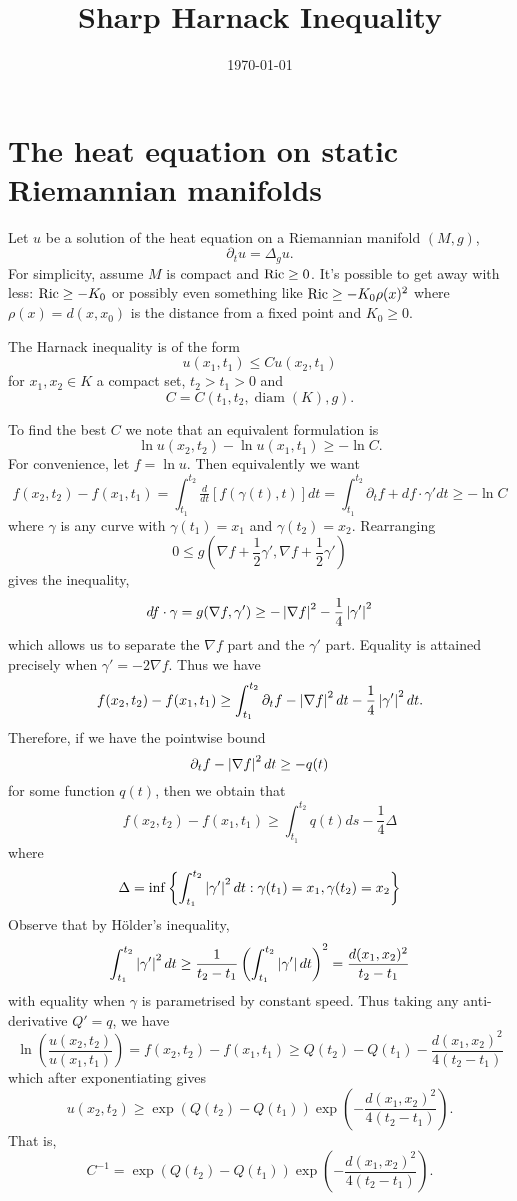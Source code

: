 \documentclass{amsart}
\begin{document}
\title{Sharp Harnack Inequality}

\curraddr{}
\email{}
\date{\today}

\dedicatory{}
\subjclass[2010]{}
\keywords{}

\maketitle

\section{The heat equation on static Riemannian manifolds}

Let $u$ be a solution of the heat equation on a Riemannian manifold $(M, g)$,
\[
\partial_t u = \Delta_g u.
\]
For simplicity, assume $M$ is compact and $\operatorname{Ric} \geq 0$. It's possible to get away with less: $\operatorname{Ric} \geq - K_0$ or possibly even something like $\operatorname{Ric} \geq -K_0 \rho(x)^2$ where $\rho(x) = d(x, x_0)$ is the distance from a fixed point and $K_0 \geq 0$.

The Harnack inequality is of the form
\[
u(x_1, t_1) \leq C u(x_2, t_1)
\]
for $x_1, x_2 \in K$ a compact set, $t_2 > t_1 > 0$ and
\[
C = C(t_1, t_2, \operatorname{diam} (K), g).
\]

To find the best $C$ we note that an equivalent formulation is
\[
\ln u(x_2, t_2) - \ln u(x_1, t_1) \geq - \ln C.
\]
For convenience, let $f = \ln u$. Then equivalently we want
\[
f(x_2, t_2) - f(x_1, t_1) = \int_{t_1}^{t_2} \tfrac{d}{dt} [f(\gamma(t), t)] dt = \int_{t_1}^{t_2} \partial_t f + df \cdot \gamma' dt \geq - \ln C
\]
where $\gamma$ is any curve with $\gamma(t_1) = x_1$ and $\gamma(t_2) = x_2$. Rearranging
\[
0 \leq g\left(\nabla f + \frac{1}{2} \gamma', \nabla f + \frac{1}{2} \gamma'\right)
\]
gives the inequality,
\[
df \cdot \gamma = g(\nabla f, \gamma') \geq -\left|{\nabla f}\right|^2 - \frac{1}{4} \left|{\gamma'}\right|^2
\]
which allows us to separate the $\nabla f$ part and the $\gamma'$ part. Equality is attained precisely when $\gamma' = -2\nabla f$. Thus we have
\[
f(x_2, t_2) - f(x_1, t_1) \geq \int_{t_1}^{t_2} \partial_t f -\left|{\nabla f}\right|^2 dt - \frac{1}{4} \left|{\gamma'}\right|^2 dt.
\]
Therefore, if we have the pointwise bound
\[
\partial_t f -\left|{\nabla f}\right|^2 dt \geq -q(t)
\]
for some function \(q(t)\), then we obtain that
\[
f(x_2, t_2) - f(x_1, t_1) \geq \int_{t_1}^{t_2} q(t) ds - \frac{1}{4} \Delta
\]
where
\[
\Delta = \inf \left\{\int_{t_1}^{t_2} \left|{\gamma'}\right|^2 dt : \gamma(t_1) = x_1, \gamma(t_2) = x_2\right\}
\]
Observe that by H\"{o}lder's inequality,
\[
\int_{t_1}^{t_2} \left|{\gamma'}\right|^2 dt \geq \frac{1}{t_2 - t_1} \left(\int_{t_1}^{t_2} \left|{\gamma'}\right| dt\right)^2 = \frac{d(x_1, x_2)^2}{t_2 - t_1}
\]
with equality when \(\gamma\) is parametrised by constant speed. Thus taking any anti-derivative \(Q' = q\), we have
\[
\ln \left(\frac{u(x_2, t_2)}{u(x_1, t_1)}\right) = f(x_2, t_2) - f(x_1, t_1) \geq Q(t_2) - Q(t_1) - \frac{d(x_1, x_2)^2}{4(t_2 - t_1)}
\]
which after exponentiating gives
\[
u(x_2, t_2) \geq \exp(Q(t_2) - Q(t_1)) \exp\left(- \frac{d(x_1, x_2)^2}{4(t_2 - t_1)}\right).
\]
That is,
\[
C^{-1} = \exp(Q(t_2) - Q(t_1)) \exp\left(- \frac{d(x_1, x_2)^2}{4(t_2 - t_1)}\right).
\]
\end{document}
